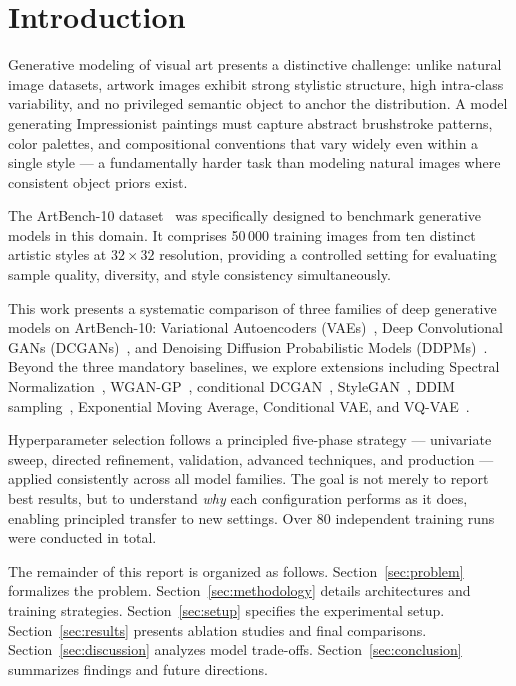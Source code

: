 \documentclass[runningheads]{llncs}
\begin{document}
\section{Introduction}

Generative modeling of visual art presents a distinctive challenge: unlike natural image datasets, artwork images exhibit strong stylistic structure, high intra-class variability, and no privileged semantic object to anchor the distribution. A model generating Impressionist paintings must capture abstract brushstroke patterns, color palettes, and compositional conventions that vary widely even within a single style — a fundamentally harder task than modeling natural images where consistent object priors exist.

The ArtBench-10 dataset~\cite{liao2022} was specifically designed to benchmark generative models in this domain. It comprises 50\,000 training images from ten distinct artistic styles at $32{\times}32$ resolution, providing a controlled setting for evaluating sample quality, diversity, and style consistency simultaneously.

This work presents a systematic comparison of three families of deep generative models on ArtBench-10: Variational Autoencoders (VAEs)~\cite{kingma2013}, Deep Convolutional GANs (DCGANs)~\cite{radford2015}, and Denoising Diffusion Probabilistic Models (DDPMs)~\cite{ho2020}. Beyond the three mandatory baselines, we explore extensions including Spectral Normalization~\cite{miyato2018}, WGAN-GP~\cite{gulrajani2017}, conditional DCGAN~\cite{sohn2015}, StyleGAN~\cite{karras2018}, DDIM sampling~\cite{song2020}, Exponential Moving Average, Conditional VAE, and VQ-VAE~\cite{oord2017}.

Hyperparameter selection follows a principled five-phase strategy — univariate sweep, directed refinement, validation, advanced techniques, and production — applied consistently across all model families. The goal is not merely to report best results, but to understand \emph{why} each configuration performs as it does, enabling principled transfer to new settings. Over 80 independent training runs were conducted in total.

The remainder of this report is organized as follows. Section~\ref{sec:problem} formalizes the problem. Section~\ref{sec:methodology} details architectures and training strategies. Section~\ref{sec:setup} specifies the experimental setup. Section~\ref{sec:results} presents ablation studies and final comparisons. Section~\ref{sec:discussion} analyzes model trade-offs. Section~\ref{sec:conclusion} summarizes findings and future directions.
\end{document}
